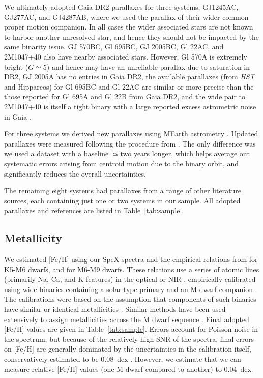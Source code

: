 \documentclass[twocolumn]{aastex62}
\begin{document}
We ultimately adopted Gaia DR2 parallaxes for three systems, GJ1245AC, GJ277AC, and GJ4287AB, where we used the parallax of their wider common proper motion companion. In all cases the wider associated stars are not known to harbor another unresolved star, and hence they should not be impacted by the same binarity issue. GJ 570BC, Gl 695BC, GJ 2005BC, Gl 22AC, and 2M1047+40 also have nearby associated stars. However, Gl 570A is extremely bright ($G\simeq5$) and hence may have an unreliable parallax due to saturation in DR2, GJ 2005A has no entries in Gaia DR2, the available parallaxes (from {\it HST} and Hipparcos) for Gl 695BC and Gl 22AC are similar or more precise than the those reported for Gl 695A and Gl 22B from Gaia DR2, and the wide pair to 2M1047+40 is itself a tight binary \citep[LP 213-67AB,][]{Dupuy2017} with a large reported excess astrometric noise in Gaia \citep[a sign of binarity,][]{2018RNAAS...2...20E}.

For three systems we derived new parallaxes using MEarth astrometry \citep{Nutzman:2008gf}. Updated parallaxes were measured following the procedure from \citet{2014ApJ...784..156D}. The only difference was we used a dataset with a baseline $\simeq$two years longer, which helps average out systematic errors arising from centroid motion due to the binary orbit, and significantly reduces the overall uncertainties. 

The remaining eight systems had parallaxes from a range of other literature sources, each containing just one or two systems in our sample. All adopted parallaxes and references are listed in Table~\ref{tab:sample}.

\subsection{Metallicity}\label{sec:feh}

We estimated [Fe/H] using our SpeX spectra and the empirical relations from \citet{Mann2013a} for K5-M6 dwarfs, and \citet{Mann2014} for M6-M9 dwarfs. These relations use a series of atomic lines (primarily Na, Ca, and K features) in the optical or NIR \citep[e.g.,][]{2010ApJ...720L.113R,Terrien:2012lr}, empirically calibrated using wide binaries containing a solar-type primary and an M-dwarf companion \citep[e.g.,][]{2005A&A...442..635B,Johnson2009,Neves2012}. The calibrations were based on the assumption that components of such binaries have similar or identical metallicities \citep[e.g.,][]{2015ApJ...801L..10T}. Similar methods have been used extensively to assign metallicities across the M dwarf sequence \citep[e.g.,][]{Terrien2015,Muirhead2015,Dressing2017,2018ApJ...853...30V,2018ApJ...854..145M}. Final adopted [Fe/H] values are given in Table~\ref{tab:sample}. Errors account for Poisson noise in the spectrum, but because of the relatively high SNR of the spectra, final errors on [Fe/H] are generally dominated by the uncertainties in the calibration itself, conservatively estimated to be 0.08~dex \citep{Mann2013a,Mann2014}. However, we estimate that we can measure relative [Fe/H] values (one M dwarf compared to another) to 0.04~dex. 
\end{document}
